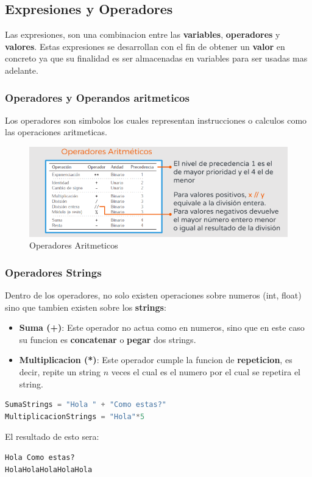 \documentclass{article}
\begin{document}
\subsection{Expresiones y Operadores}
Las expresiones, son una combinacion entre las \textbf{variables}, \textbf{operadores} y \textbf{valores}. Estas expresiones se desarrollan con el fin de obtener un \textbf{valor} en concreto ya que su finalidad es ser almacenadas en variables para ser usadas mas adelante.
\subsubsection{Operadores y Operandos aritmeticos}
Los operadores son simbolos los cuales representan instrucciones o calculos como las operaciones aritmeticas.
\begin{figure}[H]
    \centering
    \includegraphics[width=1\linewidth]{OperadoresAritmeticos.png}
    \caption{Operadores Aritmeticos}
    \label{fig:enter-label}
\end{figure}
\subsubsection{Operadores Strings}
Dentro de los operadores, no solo existen operaciones sobre numeros (int, float) sino que tambien existen sobre los \textbf{strings}:
\begin{itemize}
    \item \textbf{Suma (+)}: Este operador no actua como en numeros, sino que en este caso su funcion es \textbf{concatenar} o \textbf{pegar} dos strings.
    \item \textbf{Multiplicacion (*)}: Este operador cumple la funcion de \textbf{repeticion}, es decir, repite un string \(n\) veces el cual es el numero por el cual se repetira el string.
\end{itemize}
\begin{lstlisting}[language=Python, caption=Operaciones sobre Strings]
SumaStrings = "Hola " + "Como estas?"
MultiplicacionStrings = "Hola"*5
\end{lstlisting}
El resultado de esto sera:
\begin{lstlisting}[language=Python, caption=Operaciones sobre Strings]
Hola Como estas?
HolaHolaHolaHolaHola
\end{lstlisting}
\end{document}
